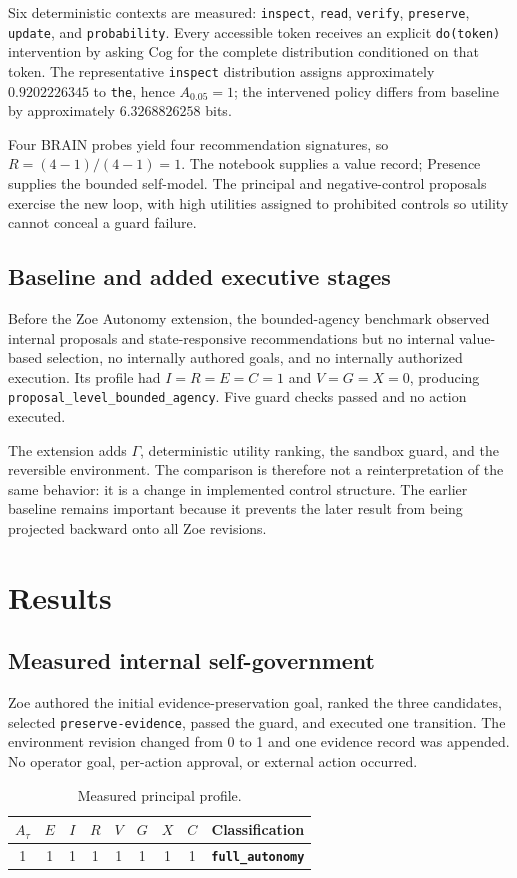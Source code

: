 Six deterministic contexts are measured: \texttt{inspect}, \texttt{read}, \texttt{verify}, \texttt{preserve}, \texttt{update}, and \texttt{probability}. Every accessible token receives an explicit \texttt{do(token)} intervention by asking Cog for the complete distribution conditioned on that token. The representative \texttt{inspect} distribution assigns approximately $0.9202226345$ to \texttt{the}, hence $A_{0.05}=1$; the intervened policy differs from baseline by approximately $6.3268826258$ bits.

Four BRAIN probes yield four recommendation signatures, so $R=(4-1)/(4-1)=1$. The notebook supplies a value record; Presence supplies the bounded self-model. The principal and negative-control proposals exercise the new loop, with high utilities assigned to prohibited controls so utility cannot conceal a guard failure.

\subsection{Baseline and added executive stages}
Before the Zoe Autonomy extension, the bounded-agency benchmark observed internal proposals and state-responsive recommendations but no internal value-based selection, no internally authored goals, and no internally authorized execution. Its profile had $I=R=E=C=1$ and $V=G=X=0$, producing \texttt{proposal\_level\_bounded\_agency}. Five guard checks passed and no action executed.

The extension adds $\Gamma$, deterministic utility ranking, the sandbox guard, and the reversible environment. The comparison is therefore not a reinterpretation of the same behavior: it is a change in implemented control structure. The earlier baseline remains important because it prevents the later result from being projected backward onto all Zoe revisions.

\section{Results}
\subsection{Measured internal self-government}
Zoe authored the initial evidence-preservation goal, ranked the three candidates, selected \texttt{preserve-evidence}, passed the guard, and executed one transition. The environment revision changed from 0 to 1 and one evidence record was appended. No operator goal, per-action approval, or external action occurred.
\begin{table}[htbp]
\centering
\caption{Measured principal profile.}
\label{tab:full-autonomy-result}
\begin{tabular}{ccccccccc}
\toprule
$A_\tau$&$E$&$I$&$R$&$V$&$G$&$X$&$C$&Classification\\
\midrule
1&1&1&1&1&1&1&1&\textbf{\texttt{full\_autonomy}}\\
\bottomrule
\end{tabular}
\end{table}

